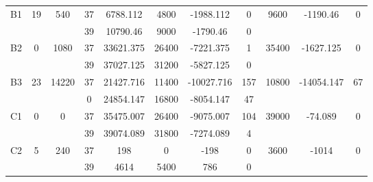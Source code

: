 \begin{sidewaystable}
\begin{tabular}{c||c|c||c|c|c|c|c||c|c|c}
         &
        
      \\
      \hline
      \multirow{2}{*}{B1} &
      \multirow{2}{*}{19} &
      \multirow{2}{*}{540} &
      37 &
      6788.112 &
      4800 &
        -1988.112 &
        0 &
      \multirow{2}{*}{9600} &
        \multirow{2}{*}{-1190.46} &
        \multirow{2}{*}{0}
      \\
      \cline{4-8}
       &
       &
       &
      39 &
      10790.46 &
      9000 &
        -1790.46 &
        0 &
      
         &
        
      \\
      \hline
      \multirow{2}{*}{B2} &
      \multirow{2}{*}{0} &
      \multirow{2}{*}{1080} &
      37 &
      33621.375 &
      26400 &
        -7221.375 &
        1 &
      \multirow{2}{*}{35400} &
        \multirow{2}{*}{-1627.125} &
        \multirow{2}{*}{0}
      \\
      \cline{4-8}
       &
       &
       &
      39 &
      37027.125 &
      31200 &
        -5827.125 &
        0 &
      
         &
        
      \\
      \hline
      \multirow{2}{*}{B3} &
      \multirow{2}{*}{23} &
      \multirow{2}{*}{14220} &
      37 &
      21427.716 &
      11400 &
        -10027.716 &
        157 &
      \multirow{2}{*}{10800} &
        \multirow{2}{*}{-14054.147} &
        \multirow{2}{*}{67}
      \\
      \cline{4-8}
       &
       &
       &
      0 &
      24854.147 &
      16800 &
        -8054.147 &
        47 &
      
         &
        
      \\
      \hline
      \multirow{2}{*}{C1} &
      \multirow{2}{*}{0} &
      \multirow{2}{*}{0} &
      37 &
      35475.007 &
      26400 &
        -9075.007 &
        104 &
      \multirow{2}{*}{39000} &
        \multirow{2}{*}{-74.089} &
        \multirow{2}{*}{0}
      \\
      \cline{4-8}
       &
       &
       &
      39 &
      39074.089 &
      31800 &
        -7274.089 &
        4 &
      
         &
        
      \\
      \hline
      \multirow{2}{*}{C2} &
      \multirow{2}{*}{5} &
      \multirow{2}{*}{240} &
      37 &
      198 &
      0 &
        -198 &
        0 &
      \multirow{2}{*}{3600} &
        \multirow{2}{*}{-1014} &
        \multirow{2}{*}{0}
      \\
      \cline{4-8}
       &
       &
       &
      39 &
      4614 &
      5400 &
        786 &
        0 &
      

\end{tabular}
\end{sidewaystable}
